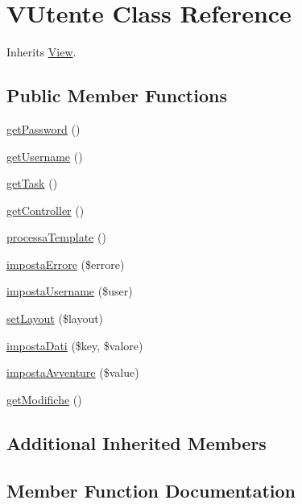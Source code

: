 \hypertarget{class_v_utente}{}\section{V\+Utente Class Reference}
\label{class_v_utente}


Inherits \mbox{\hyperlink{class_view}{View}}.

\subsection*{Public Member Functions}
\begin{DoxyCompactItemize}
\item 
\mbox{\hyperlink{class_v_utente_a04e0957baeb7acde9c0c86556da2d43f}{get\+Password}} ()
\item 
\mbox{\hyperlink{class_v_utente_a81b37a3c9d639574e394f80c1138c75e}{get\+Username}} ()
\item 
\mbox{\hyperlink{class_v_utente_a13871c4434338f02d6f8d430fa0597f2}{get\+Task}} ()
\item 
\mbox{\hyperlink{class_v_utente_aa8b89e0bad51878addc1300cd3e95b5c}{get\+Controller}} ()
\item 
\mbox{\hyperlink{class_v_utente_a64bdc484fc7074989b4b2c0ebc63aec2}{processa\+Template}} ()
\item 
\mbox{\hyperlink{class_v_utente_acb9fd807e8b09b46b95fc55b65edeb36}{imposta\+Errore}} (\$errore)
\item 
\mbox{\hyperlink{class_v_utente_ab16a8f6e348cc54284c9a57bf5d3621e}{imposta\+Username}} (\$user)
\item 
\mbox{\hyperlink{class_v_utente_a702b3376618a26e6c02c05bae65c6b9e}{set\+Layout}} (\$layout)
\item 
\mbox{\hyperlink{class_v_utente_ab3c0dc76f35667b7a13404d03b7fdb36}{imposta\+Dati}} (\$key, \$valore)
\item 
\mbox{\hyperlink{class_v_utente_afcbe39b7f4848575a8fbe4e18c7261b5}{imposta\+Avventure}} (\$value)
\item 
\mbox{\hyperlink{class_v_utente_ad153372cfab6f86800a89b5a378d9760}{get\+Modifiche}} ()
\end{DoxyCompactItemize}
\subsection*{Additional Inherited Members}


\subsection{Member Function Documentation}
\mbox{\label{class_v_utente_aa8b89e0bad51878addc1300cd3e95b5c}} 

